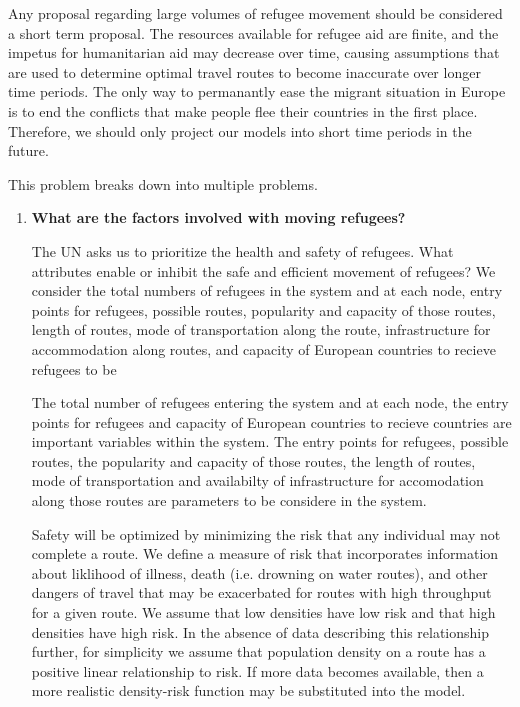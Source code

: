 \documentclass{article}
\begin{document}
Any proposal regarding large volumes of refugee movement should be considered a short term proposal. The resources available for refugee aid are finite, and the impetus for humanitarian aid may decrease over time, causing assumptions that are used to determine optimal travel routes to become inaccurate over longer time periods. The only way to permanantly ease the migrant situation in Europe is to end the conflicts that make people flee their countries in the first place. Therefore, we should only project our models into short time periods in the future.


This problem breaks down into multiple problems.

\begin{enumerate}
    \item {\bf What are the factors involved with moving refugees?}

    The UN asks us to prioritize the health and safety of refugees. What attributes enable or inhibit the safe and efficient movement of refugees? We consider the total numbers of refugees in the system and at each node, entry points for refugees, possible routes, popularity and capacity of those routes, length of routes, mode of transportation along the route, infrastructure for accommodation along routes, and capacity of European countries to recieve refugees to be 

    The total number of refugees entering the system and at each node, the entry points for refugees and capacity of European countries to recieve countries are important variables within the system. The entry points for refugees, possible routes, the popularity and capacity of those routes, the length of routes, mode of transportation and availabilty of infrastructure for accomodation along those routes are parameters to be considere in the system.

    Safety will be optimized by minimizing the risk that any individual may not complete a route. We define a measure of risk that incorporates information about liklihood of illness, death (i.e. drowning on water routes), and other dangers of travel that may be exacerbated for routes with high throughput for a given route. We assume that low densities have low risk and that high densities have high risk. In the absence of data describing this relationship further, for simplicity we assume that population density on a route has a positive linear relationship to risk. If more data becomes available, then a more realistic density-risk function may be substituted into the model.


\end{enumerate}
\end{document}
